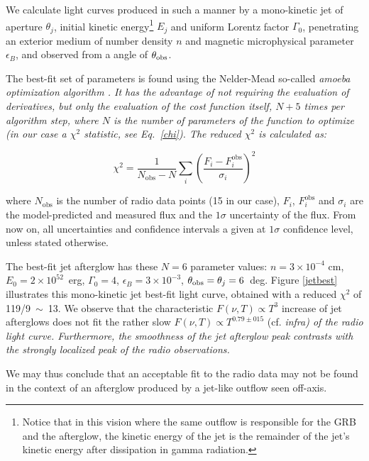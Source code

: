 We calculate light curves produced in such a manner by a mono-kinetic jet of aperture $\theta_j$, initial kinetic energy\footnote{Notice that in this vision where the same outflow is responsible for the GRB and the afterglow, the kinetic energy of the jet is the remainder of the jet's kinetic energy after dissipation in gamma radiation.} $E_j$ and uniform Lorentz factor $\Gamma_0$, penetrating an exterior medium of number density $n$ and magnetic microphysical parameter $\epsilon_B$, and observed from a angle of $\theta_{\rm{obs}}$.

The best-fit set of parameters is found using the Nelder-Mead so-called \it{amoeba} optimization algorithm \citep{20}. It has the advantage of not requiring the evaluation of derivatives, but only the evaluation of the cost function itself, $N + 5$ times per algorithm step, where $N$ is the number of parameters of the function to optimize (in our case a $\chi^2$ statistic, see Eq.~\ref{chi}). The reduced $\chi^2$ is calculated as:

\begin{equation}
    \label{chi}
    \chi^2 = \frac{1}{N_\text{obs} - N} \sum_i\left( \frac{F_i - F_i^\text{obs}}{\sigma_i} \right)^2
\end{equation}

where $N_\text{obs}$ is the number of radio data points (15 in our case), $F_i$, $F_i^\text{obs}$ and $\sigma_i$ are the model-predicted and measured flux and the $1\sigma$ uncertainty of the flux. From now on, all uncertainties and confidence intervals a given at $1\sigma$ confidence level, unless stated otherwise.


The best-fit jet afterglow has these $N = 6$ parameter values: $n = 3 \times 10^{-4}$ cm, $E_0 = 2 \times 10^{52}$~erg, $\Gamma_0 = 4$, $\epsilon_B = 3 \times 10^{-3}$, $\thetaobs = \theta_j = 6$~deg. Figure \ref{jetbest} illustrates this mono-kinetic jet best-fit light curve, obtained with a reduced $\chi^2$ of 119/9~$\sim$~13. We observe that the characteristic $F(\nu, T) \propto T^3$ increase of jet afterglows does not fit the rather slow $F(\nu, T) \propto T^{0.79\pm015}$ (cf. \it{infra}) of the radio light curve. Furthermore, the smoothness of the jet afterglow peak contrasts with the strongly localized peak of the radio observations.

We may thus conclude that an acceptable fit to the radio data may not be found in the context of an afterglow produced by a jet-like outflow seen off-axis.




